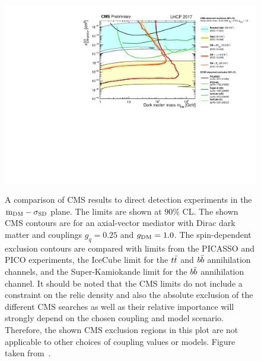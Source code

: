 \begin{figure}[ht]
  \centering
  \includegraphics[width=\textwidth]{SD_CMSDD_Summary.pdf}\\
  \caption{A comparison of \protect \acs{CMS} results to direct detection experiments in the $\protect\mathrm{m_{DM}}-\sigma_{\mathrm{SD}}$ plane. The limits are shown at $90\%$ CL. The shown \protect \acs{CMS} contours are for an axial-vector mediator with Dirac dark matter and couplings $g_q=0.25$ and $\protect g_{\mathrm{DM}} = 1.0$. The spin-dependent exclusion contours are compared with limits from the PICASSO and PICO experiments, the IceCube limit for the $\protect t\bar{t}$ and $\protect b\bar{b}$ annihilation channels, and the Super-Kamiokande limit for the $\protect b\bar{b}$ annihilation channel.  It should be noted that the \protect \acs{CMS} limits do not include a constraint on the relic density and also the absolute exclusion of the different \protect \acs{CMS} searches as well as their relative importance will strongly depend on the chosen coupling and model scenario.  Therefore, the shown \protect  \acs{CMS} exclusion regions in this plot are not applicable to other choices of coupling values or models. Figure taken from~\cite{DMsummary}.}
  \label{fig:summary_SD}
\end{figure}

